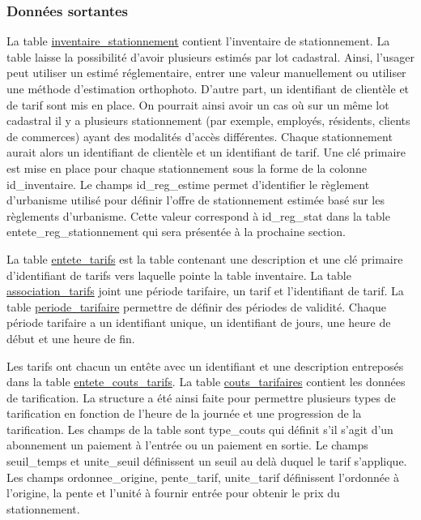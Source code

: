     \subsubsection{Données sortantes}
    La table \underline{inventaire\_stationnement} contient l'inventaire de stationnement. La table laisse la possibilité d'avoir plusieurs estimés par lot cadastral. Ainsi, l'usager peut utiliser un estimé réglementaire, entrer une valeur manuellement ou utiliser une méthode d'estimation orthophoto. D'autre part, un identifiant de clientèle et de tarif sont mis en place. On pourrait ainsi avoir un cas où sur un même lot cadastral il y a plusieurs stationnement (par exemple, employés, résidents, clients de commerces) ayant des modalités d'accès différentes. Chaque stationnement aurait alors un identifiant de clientèle et un identifiant de tarif. Une clé primaire est mise en place pour chaque stationnement sous la forme de la colonne id\_inventaire. Le champs id\_reg\_estime permet d'identifier le règlement d'urbanisme utilisé pour définir l'offre de stationnement estimée basé sur les règlements d'urbanisme. Cette valeur correspond à id\_reg\_stat dans la table entete\_reg\_stationnement qui sera présentée à la prochaine section.\par
    La table \underline{entete\_tarifs} est la table contenant une description et une clé primaire d'identifiant de tarifs vers laquelle pointe la table inventaire. La table \underline{association\_tarifs} joint une période tarifaire, un tarif et l'identifiant de tarif. La table \underline{periode\_tarifaire} permettre de définir des périodes de validité. Chaque période tarifaire a un identifiant unique, un identifiant de jours, une heure de début et une heure de fin. \par
    Les tarifs ont chacun un entête avec un identifiant et une description entreposés dans la table \underline{entete\_couts\_tarifs}. La table \underline{couts\_tarifaires} contient les données de tarification. La structure a été ainsi faite pour permettre plusieurs types de tarification en fonction de l'heure de la journée et une progression de la tarification. Les champs de la table sont type\_couts qui définit s'il s'agit d'un abonnement un paiement à l'entrée ou un paiement en sortie. Le champs seuil\_temps et unite\_seuil définissent un seuil au delà duquel le tarif s'applique. Les champs ordonnee\_origine, pente\_tarif, unite\_tarif définissent l'ordonnée à l'origine, la pente et l'unité à fournir entrée pour obtenir le prix du stationnement.\par
